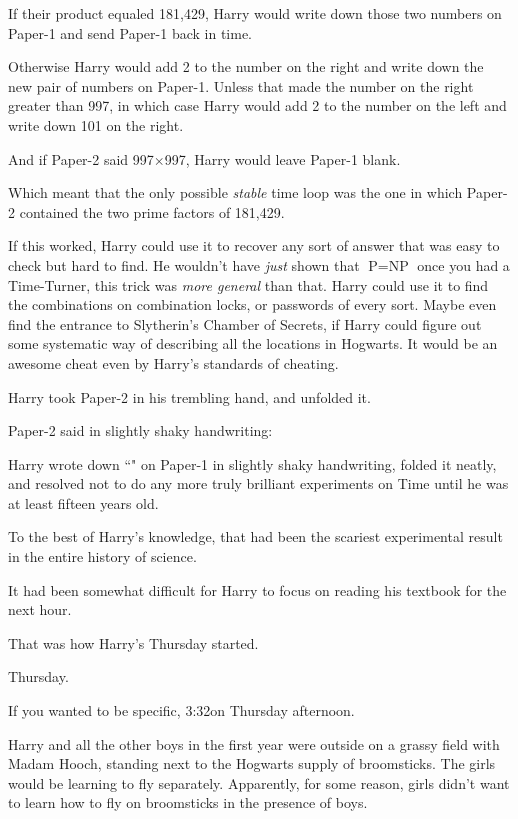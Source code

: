 If their product equaled 181,429, Harry would write down those two numbers on Paper-1 and send Paper-1 back in time.

Otherwise Harry would add 2 to the number on the right and write down the new pair of numbers on Paper-1. Unless that made the number on the right greater than 997, in which case Harry would add 2 to the number on the left and write down 101 on the right.

And if Paper-2 said 997$\times$997, Harry would leave Paper-1 blank.

Which meant that the only possible \emph{stable} time loop was the one in which Paper-2 contained the two prime factors of 181,429.

If this worked, Harry could use it to recover any sort of answer that was easy to check but hard to find. He wouldn't have \emph{just} shown that $\mbox{P}=\mbox{NP}$ once you had a Time-Turner, this trick was \emph{more general} than that. Harry could use it to find the combinations on combination locks, or passwords of every sort. Maybe even find the entrance to Slytherin's Chamber of Secrets, if Harry could figure out some systematic way of describing all the locations in Hogwarts. It would be an awesome cheat even by Harry's standards of cheating.

Harry took Paper-2 in his trembling hand, and unfolded it.

Paper-2 said in slightly shaky handwriting:

\begin{writtenNote}
\end{writtenNote}

Harry wrote down ``\emph{}" on Paper-1 in slightly shaky handwriting, folded it neatly, and resolved not to do any more truly brilliant experiments on Time until he was at least fifteen years old.

To the best of Harry's knowledge, that had been the scariest experimental result in the entire history of science.

It had been somewhat difficult for Harry to focus on reading his textbook for the next hour.

That was how Harry's Thursday started.

\later

Thursday.

If you wanted to be specific, 3:32\pm on Thursday afternoon.

Harry and all the other boys in the first year were outside on a grassy field with Madam Hooch, standing next to the Hogwarts supply of broomsticks. The girls would be learning to fly separately. Apparently, for some reason, girls didn't want to learn how to fly on broomsticks in the presence of boys.

